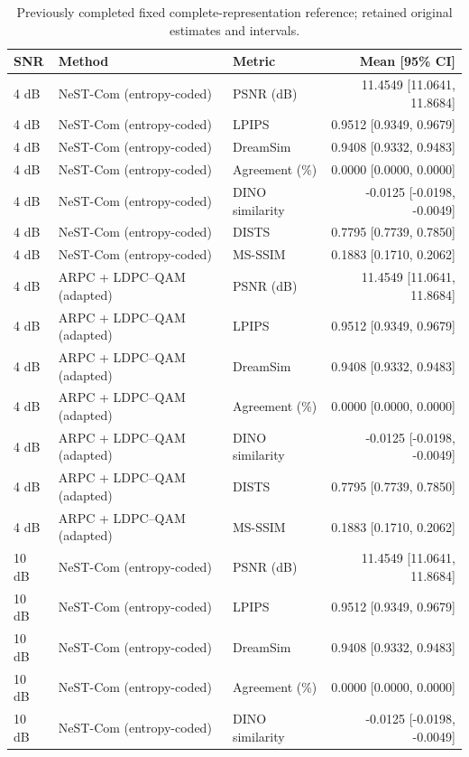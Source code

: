 \begin{table}[t]
\centering\small
\caption{Previously completed fixed complete-representation reference; retained original estimates and intervals.}
\begin{tabular}{lllr}
\toprule
SNR & Method & Metric & Mean [95\% CI] \\
\midrule
4 dB & NeST-Com (entropy-coded) & PSNR (dB) & 11.4549 [11.0641, 11.8684] \\
4 dB & NeST-Com (entropy-coded) & LPIPS & 0.9512 [0.9349, 0.9679] \\
4 dB & NeST-Com (entropy-coded) & DreamSim & 0.9408 [0.9332, 0.9483] \\
4 dB & NeST-Com (entropy-coded) & Agreement (\%) & 0.0000 [0.0000, 0.0000] \\
4 dB & NeST-Com (entropy-coded) & DINO similarity & -0.0125 [-0.0198, -0.0049] \\
4 dB & NeST-Com (entropy-coded) & DISTS & 0.7795 [0.7739, 0.7850] \\
4 dB & NeST-Com (entropy-coded) & MS-SSIM & 0.1883 [0.1710, 0.2062] \\
4 dB & ARPC + LDPC--QAM (adapted) & PSNR (dB) & 11.4549 [11.0641, 11.8684] \\
4 dB & ARPC + LDPC--QAM (adapted) & LPIPS & 0.9512 [0.9349, 0.9679] \\
4 dB & ARPC + LDPC--QAM (adapted) & DreamSim & 0.9408 [0.9332, 0.9483] \\
4 dB & ARPC + LDPC--QAM (adapted) & Agreement (\%) & 0.0000 [0.0000, 0.0000] \\
4 dB & ARPC + LDPC--QAM (adapted) & DINO similarity & -0.0125 [-0.0198, -0.0049] \\
4 dB & ARPC + LDPC--QAM (adapted) & DISTS & 0.7795 [0.7739, 0.7850] \\
4 dB & ARPC + LDPC--QAM (adapted) & MS-SSIM & 0.1883 [0.1710, 0.2062] \\
10 dB & NeST-Com (entropy-coded) & PSNR (dB) & 11.4549 [11.0641, 11.8684] \\
10 dB & NeST-Com (entropy-coded) & LPIPS & 0.9512 [0.9349, 0.9679] \\
10 dB & NeST-Com (entropy-coded) & DreamSim & 0.9408 [0.9332, 0.9483] \\
10 dB & NeST-Com (entropy-coded) & Agreement (\%) & 0.0000 [0.0000, 0.0000] \\
10 dB & NeST-Com (entropy-coded) & DINO similarity & -0.0125 [-0.0198, -0.0049] \\

\end{tabular}
\end{table}
